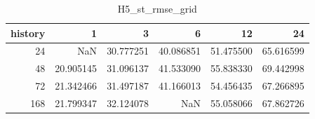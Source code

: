 \begin{table}
\caption{H5_st_rmse_grid}
\label{tab:H5_st_rmse_grid}
\begin{tabular}{rrrrrr}
\toprule
history & 1 & 3 & 6 & 12 & 24 \\
\midrule
24 & NaN & 30.777251 & 40.086851 & 51.475500 & 65.616599 \\
48 & 20.905145 & 31.096137 & 41.533090 & 55.838330 & 69.442998 \\
72 & 21.342466 & 31.497187 & 41.166013 & 54.456435 & 67.266895 \\
168 & 21.799347 & 32.124078 & NaN & 55.058066 & 67.862726 \\
\bottomrule
\end{tabular}
\end{table}
